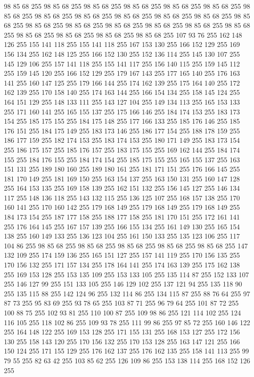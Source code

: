 98 85 68 255 98 85 68 255 98 85 68 255 98 85 68 255 98 85 68 255 98 85 68 255 98 85 68 255 98 85 68 255 98 85 68 255 98 85 68 255 98 85 68 255 98 85 68 255 98 85 68 255 98 85 68 255 98 85 68 255 98 85 68 255 98 85 68 255 98 85 68 255 98 85 68 255 98 85 68 255 98 85 68 255 98 85 68 255 98 85 68 255 107 93 76 255 162 148 126 255 155 141 118 255 155 141 118 255 167 153 130 255 166 152 129 255 169 156 134 255 162 148 125 255 166 152 130 255 152 136 114 255 145 130 107 255 145 129 106 255 157 141 118 255 155 141 117 255 156 140 115 255 159 145 112 255 159 145 120 255 166 152 129 255 179 167 143 255 177 165 140 255 176 163 141 255 160 147 125 255 179 166 144 255 174 162 139 255 175 164 140 255 172 162 139 255 170 158 140 255 174 163 144 255 166 154 134 255 158 145 124 255 164 151 129 255 148 133 111 255 143 127 104 255 149 134 113 255 165 153 133 255 171 160 141 255 165 155 137 255 175 166 146 255 184 174 153 255 183 173 154 255 185 175 155 255
184 175 148 255 177 166 133 255 185 176 146 255 185 176 151 255 184 175 149 255 183 173 146 255 186 177 154 255 188 178 159 255 186 177 159 255 182 174 153 255 183 174 153 255 180 171 149 255 183 173 154 255 186 175 157 255 185 176 157 255 183 175 155 255 169 162 144 255 184 174 155 255 184 176 155 255 184 174 154 255 185 175 155 255 165 155 137 255 163 151 131 255 189 180 160 255 189 180 161 255 181 171 151 255 176 166 145 255 181 170 149 255 181 169 150 255 163 154 137 255 163 150 131 255 160 147 128 255 164 153 135 255 169 158 139 255 162 151 132 255 156 145 127 255 146 134 117 255 148 136 118 255 143 132 115 255 136 125 107 255 168 157 138 255 170 160 141 255 170 160 142 255 179 168 149 255 179 168 149 255 179 168 149 255 184 173 154 255 187 177 158 255 188 177 158 255 181 170 151 255 172 161 141 255 176 164 145 255 167 157 139 255 166 155 134 255 161 149 130 255 165 154 138 255 160 149 133 255 136 123 104 255 161 150 133 255 135 123 106 255 117 104 86 255 98 85 68 255 98 85 68 255 98 85 68 255
98 85 68 255 98 85 68 255 147 132 109 255 174 159 136 255 165 151 127 255 157 141 119 255 170 156 135 255 170 156 132 255 171 157 134 255 178 164 141 255 174 163 139 255 175 162 138 255 169 153 128 255 153 135 109 255 153 133 105 255 135 114 87 255 152 133 107 255 146 127 99 255 151 133 105 255 146 129 102 255 137 121 94 255 135 118 90 255 135 115 88 255 142 124 96 255 132 114 86 255 134 115 87 255 88 76 64 255 97 87 73 255 95 83 69 255 93 78 65 255 103 87 71 255 96 79 64 255 101 87 72 255 100 88 75 255 102 93 81 255 110 100 87 255 109 98 86 255 121 114 102 255 124 116 105 255 118 102 86 255 109 93 78 255 111 99 86 255 97 85 72 255 160 146 122 255 164 148 122 255 169 153 128 255 171 155 131 255 168 153 127 255 172 156 130 255 158 143 120 255 170 156 132 255 170 153 128 255 163 147 121 255 166 150 124 255 171 155 129 255 176 162 137 255 176 162 135 255 158 141 113 255 99 79 55 255 82 63 42 255 103 85 62 255 126 109 86 255 153 138 114 255 168 152 126 255
